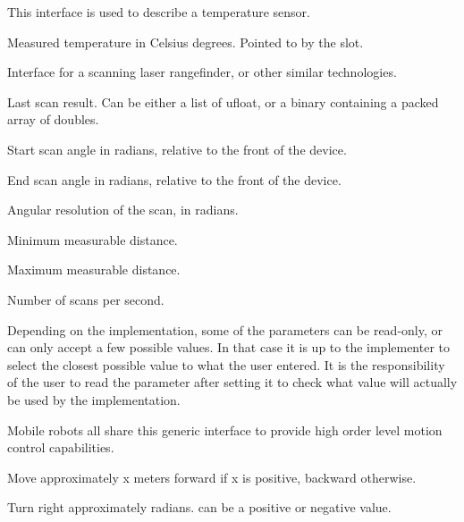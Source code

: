 This interface is used to describe a temperature sensor.

\begin{slots}
  {%
    Measured temperature in Celsius degrees.  Pointed to by the
     slot.%
  }
\end{slots}

Interface for a scanning laser rangefinder, or other similar technologies.

\begin{slots}
  {%
    Last scan result. Can be either a list of ufloat, or a binary containing
    a packed array of doubles.
  }

  {%
    Start scan angle in radians, relative to the front of the device.%
  }

  {%
    End scan angle in radians, relative to the front of the device.%
  }

  {%
    Angular resolution of the scan, in radians.%
  }

  {%
    Minimum measurable distance.%
  }

  {%
    Maximum measurable distance.%
  }

  {%
    Number of scans per second.%
  }
\end{slots}

Depending on the implementation, some of the parameters can be read-only, or
can only accept a few possible values. In that case it is up to the implementer
to select the closest possible value to what the user entered. It is the
responsibility of the user to read the parameter after setting it to check
what value will actually be used by the implementation.



Mobile robots all share this generic interface to provide high order
level motion control capabilities.

\begin{slots}
  {%
    Move approximately x meters forward if x is positive, backward
    otherwise.%
  }

  {%
    Turn right approximately  radians.   can be a
    positive or negative value.%
  }

\end{slots}


